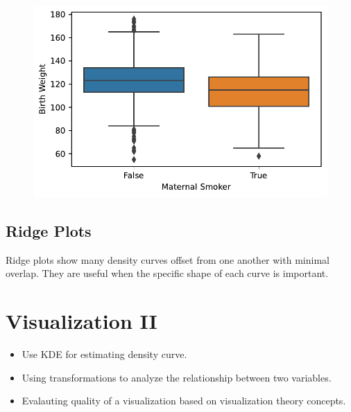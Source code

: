 \documentclass[
  letterpaper,
  DIV=11,
  numbers=noendperiod]{scrreprt}
\providecommand{\tightlist}{%
  \setlength{\itemsep}{0pt}\setlength{\parskip}{0pt}}\usepackage{longtable,booktabs,array}
\begin{document}
\begin{figure}[H]

{\centering \includegraphics{visualization_1/visualization_1_files/figure-pdf/cell-23-output-1.pdf}

}

\end{figure}

\hypertarget{ridge-plots}{%
\section{Ridge Plots}\label{ridge-plots}}

Ridge plots show many density curves offset from one another with
minimal overlap. They are useful when the specific shape of each curve
is important.


\hypertarget{visualization-ii}{%
\chapter{Visualization II}\label{visualization-ii}}

\begin{tcolorbox}[enhanced jigsaw, rightrule=.15mm, opacityback=0, colbacktitle=quarto-callout-note-color!10!white, opacitybacktitle=0.6, coltitle=black, toptitle=1mm, colback=white, toprule=.15mm, leftrule=.75mm, breakable, bottomtitle=1mm, bottomrule=.15mm, arc=.35mm, title=\textcolor{quarto-callout-note-color}{\faInfo}\hspace{0.5em}{Note}, colframe=quarto-callout-note-color-frame, titlerule=0mm, left=2mm]

\begin{itemize}
\tightlist
\item
  Use KDE for estimating density curve.
\item
  Using transformations to analyze the relationship between two
  variables.
\item
  Evalauting quality of a visualization based on visualization theory
  concepts.
\end{itemize}

\end{tcolorbox}
\end{document}
